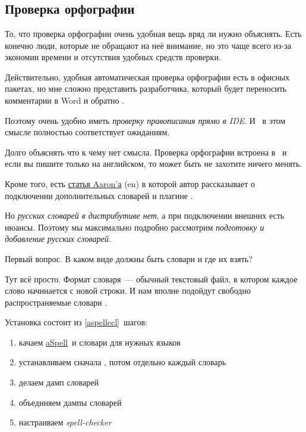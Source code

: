 \chapter{\eclipse}\label{eclipse}

\section{Проверка орфографии}


То, что проверка орфографии очень удобная вещь вряд ли нужно объяснять. Есть
конечно люди, которые не обращают на неё внимание, но это чаще всего из-за
экономии времени и отсутствия удобных средств проверки.

Действительно, удобная автоматическая проверка орфографии есть в офисных
пакетах, но мне сложно представить разработчика, который будет переносить
комментарии в Word и обратно \smiley.

Поэтому очень удобно иметь \emph{проверку правописания прямо в IDE}. И \eclipse\
в этом смысле полностью соответствует ожиданиям.

Долго объяснять что к чему нет смысла. Проверка орфографии встроена в \eclipse\
и если вы пишите только на английском, то может быть не захотите ничего менять.

Кроме того, есть
\href{http://www.102degrees.com/blog/2007/07/09/spell-checking-in-eclipse-pdt/}{статья
Aaron'а} (en) в которой автор рассказывает о подключении дополнительных словарей
и плагине \file{eSpell}.

Но \emph{русских словарей в дистрибутиве нет}, а при подключении внешних есть
нюансы. Поэтому мы максимально подробно рассмотрим \emph{подготовку и добавление
русских словарей}.

Первый вопрос. В каком виде должны быть словари и где их взять?

Тут всё просто. Формат словаря\ --- обычный текстовый файл, в котором каждое
слово начинается с новой строки. И нам вполне подойдут свободно распространяемые
словари \file{aSpell}.

Установка состоит из \ref{aspellecl}\ шагов:
\begin{enumerate}
  \item качаем \href{}{aSpell}\ и словари для нужных языков
  \item устанавливаем сначала , потом отдельно каждый словарь
  \item делаем дамп словарей 
  \item объединяем дампы словарей
  \item \label{aspellecl} настраиваем \emph{spell-checker} \eclipse
\end{enumerate}

